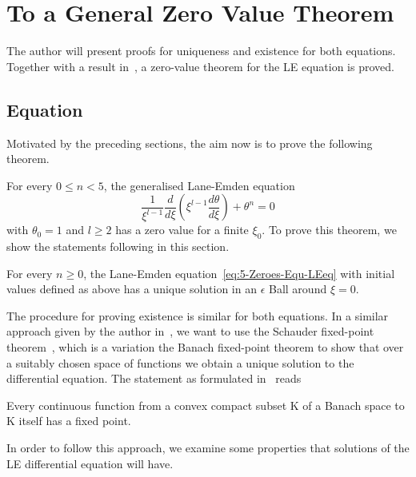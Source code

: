 \section{To a General Zero Value Theorem}
\label{sec:5-zeroes}
The author will present proofs for uniqueness and existence for both equations.
Together with a result in~\cite{quittnerSuperlinearParabolicProblems2007}, a zero-value theorem for the \ac{LE} equation is proved.
\subsection{\texorpdfstring{}{LE} Equation}
\label{subsec:5-zeroes-le-equation}
Motivated by the preceding sections, the aim now is to prove the following theorem.
\begin{theorem}
	\label{5-Zeroes-Theo-Lane-EmdenFiniteBoundary}
	For every $0\leq n<5$, the generalised Lane-Emden equation
	\begin{equation}
		\frac{1}{\xi^{l-1}}\frac{d}{d\xi}\left(\xi^{l-1}\frac{d\theta}{d\xi}\right)+\theta^n=0
		\label{eq:5-Zeroes-Equ-LEeq}
	\end{equation}
	with $\theta_0=1$ and $l\geq2$ has a zero value for a finite $\xi_0$.
	To prove this theorem, we show the statements following in this section.
\end{theorem}
\begin{lemma}
	\label{5-Zeroes-Lem-Lane-Emden-Local-Existence}
	For every $n\geq0$, the Lane-Emden equation~\ref{eq:5-Zeroes-Equ-LEeq} with initial values defined as above has a unique solution in an $\epsilon$ Ball around $\xi=0$.
\end{lemma}\noindent
The procedure for proving existence is similar for both equations.
In a similar approach given by the author in~\cite[p.~50]{quittnerSuperlinearParabolicProblems2007}, we want to use the Schauder fixed-point theorem~\cite{schauderFixpunktsatzFunktionalraumen1930}, which is a variation the Banach fixed-point theorem to show that over a suitably chosen space of functions we obtain a unique solution to the differential equation.
The statement as formulated in~\cite{minazzoTheoremesPointFixe2007} reads
\begin{theorem}
	Every continuous function from a convex compact subset K of a Banach space to K itself has a fixed point.
\end{theorem}\noindent
In order to follow this approach, we examine some properties that solutions of the \ac{LE} differential equation will have.
